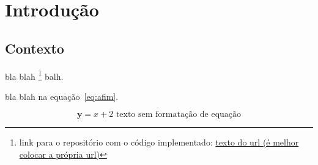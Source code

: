 \chapter{Introdução}\label{cap:introducao} %

\section{Contexto} %


bla blah \footnote{link para o repositório com o código implementado: \href{https://weversonvn.github.io}{texto do url (é melhor colocar a própria url)}} balh.

bla blah na equação~\ref{eq:afim}.

\begin{equation}\label{eq:afim}
	\mathbf{y}=x+2\text{ texto sem formatação de equação}
\end{equation}

